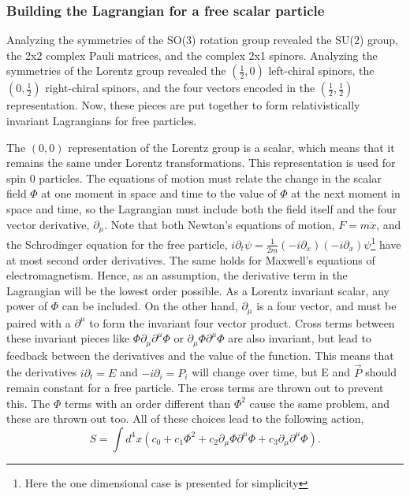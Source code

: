 \subsubsection{Building the Lagrangian for a free scalar particle}

Analyzing the symmetries of the SO(3) rotation group revealed the SU(2) group, the 2x2 complex Pauli matrices, and the complex 2x1 spinors. Analyzing the symmetries of the Lorentz group revealed the $(\frac{1}{2}, 0)$ left-chiral spinors, the $(0, \frac{1}{2})$ right-chiral spinors, and the four vectors encoded in the $(\frac{1}{2}, \frac{1}{2})$ representation. Now, these pieces are put together to form relativistically invariant Lagrangians for free particles.  

The $(0,0)$ representation of the Lorentz group is a scalar, which means that it remains the same under Lorentz transformations. This representation is used for spin 0 particles. The equations of motion must relate the change in the scalar field $\Phi$ at one moment in space and time to the value of $\Phi$ at the next moment in space and time, so the Lagrangian must include both the field itself and the four vector derivative, $\partial_\mu$. Note that both Newton's equations of motion, $F=m\ddot{x}$, and the Schrodinger equation for the free particle, $i\partial_t\psi = \frac{1}{2m}(-i\partial_x)(-i\partial_x)\psi$\footnote{Here the one dimensional case is presented for simplicity} have at most second order derivatives. The same holds for Maxwell's equations of electromagnetism. Hence, as an assumption, the derivative term in the Lagrangian will be the lowest order possible. As a Lorentz invariant scalar, any power of $\Phi$ can be included. On the other hand, $\partial_\mu$ is a four vector, and must be paired with a $\partial^\mu$ to form the invariant four vector product. Cross terms between these invariant pieces like $\Phi\partial_\mu\partial^\mu\Phi$ or $\partial_\mu\Phi\partial^\mu\Phi$ are also invariant, but lead to feedback between the derivatives and the value of the function. This means that the derivatives $i\partial_t = E$ and $-i\partial_i = P_i$ will change over time, but E and $\vec{P}$ should remain constant for a free particle. The cross terms are thrown out to prevent this. The $\Phi$ terms with an order different than $\Phi^2$ cause the same problem, and these are thrown out too. All of these choices lead to the following action, 
\begin{equation}
S = \int d^4x \left(c_0 + c_1 \Phi^2  
+ c_2 \partial_\mu\Phi\partial^\mu\Phi + c_3 \partial_\mu \partial^\mu \Phi\right).
\end{equation}

